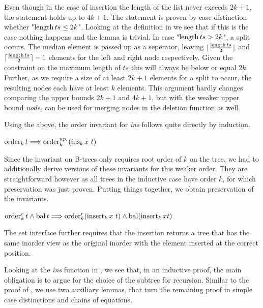 Even though in the case of insertion the length of the list
never exceeds $2k+1$, the statement holds up to $4k+1$.
The statement is proven by case distinction whether "$\operatorname{length} ts \le 2k$".
Looking at the definition in 
we see that if this is the case nothing happens and the lemma is trivial.
In case "$\operatorname{length} ts > 2k$", a split occurs.
The median element is passed up as a seperator, leaving
$\lfloor\frac{\operatorname{length} ts}{2}\rfloor$ and $\lceil\frac{\operatorname{length} ts}{2}\rceil - 1$
elements for the left and right node respectively.
Given the constraint on the maximum length of $ts$
this will always be below or equal $2k$.
Further, as we require a size of at least $2k+1$ elements for a split to occur,
the resulting nodes each have at least $k$ elements.
This argument hardly changes comparing the upper bounds $2k+1$ and $4k+1$,
but with the weaker upper bound \textit{node}$_i$ can be used for merging nodes
in the deletion function as well.

Using the above, the order invariant for \textit{ins}
follows quite directly by induction.

\begin{lemma}
    $\operatorname{order}_k t \Longrightarrow \operatorname{order}^{up_i}_k (\operatorname{ins}_k x\ t)$
\end{lemma}

Since the invariant on B-trees only requires root order of $k$ on the
tree, we had to additionally derive versions of
these invariants for this weaker order.
They are straightforward however as all trees in the inductive case
have order $k$, for which preservation was just proven.
Putting things together, we obtain preservation of the invariants.

\begin{theorem}
    \label{thm:ins-invar}
    $\operatorname{order}^r_k t \wedge \operatorname{bal} t \Longrightarrow
    \operatorname{order}^r_k (\operatorname{insert}_k x\ t) \wedge \operatorname{bal} (\operatorname{insert}_k x t)$
\end{theorem}


The set interface further requires that the insertion returns a tree
that has the same inorder view as the original inorder with the element
inserted at the correct position.

Looking at the \textit{ins} function in ,
we see that, in an inductive proof, the main obligation
is to argue for the choice of the subtree for recursion.
Similar to the proof of ,
we use two auxiliary lemmas, that turn the remaining
proof in simple case distinctions and chains of equations.

